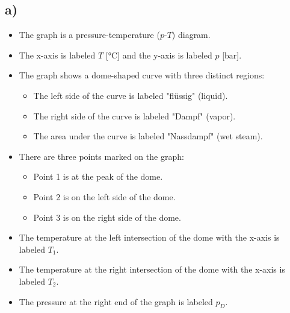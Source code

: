 

\subsection*{a)}

\begin{itemize}
    \item The graph is a pressure-temperature ($p$-$T$) diagram.
    \item The x-axis is labeled $T$ [°C] and the y-axis is labeled $p$ [bar].
    \item The graph shows a dome-shaped curve with three distinct regions: 
        \begin{itemize}
            \item The left side of the curve is labeled "flüssig" (liquid).
            \item The right side of the curve is labeled "Dampf" (vapor).
            \item The area under the curve is labeled "Nassdampf" (wet steam).
        \end{itemize}
    \item There are three points marked on the graph:
        \begin{itemize}
            \item Point 1 is at the peak of the dome.
            \item Point 2 is on the left side of the dome.
            \item Point 3 is on the right side of the dome.
        \end{itemize}
    \item The temperature at the left intersection of the dome with the x-axis is labeled $T_1$.
    \item The temperature at the right intersection of the dome with the x-axis is labeled $T_2$.
    \item The pressure at the right end of the graph is labeled $p_D$.
\end{itemize}